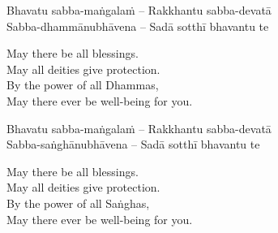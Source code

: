 Bhavatu sabba-maṅgalaṁ – Rakkhantu sabba-devatā\\
Sabba-dhammānubhāvena – Sadā sotthī bhavantu te

\begin{english}
  May there be all blessings.\\
  May all deities give protection.\\
  By the power of all Dhammas,\\
  May there ever be well-being for you.
\end{english}

Bhavatu sabba-maṅgalaṁ – Rakkhantu sabba-devatā\\
Sabba-saṅghānubhāvena – Sadā sotthī bhavantu te

\begin{english}
  May there be all blessings.\\
  May all deities give protection.\\
  By the power of all Saṅghas,\\
  May there ever be well-being for you.
\end{english}

\suttaRef{[Trad]}

